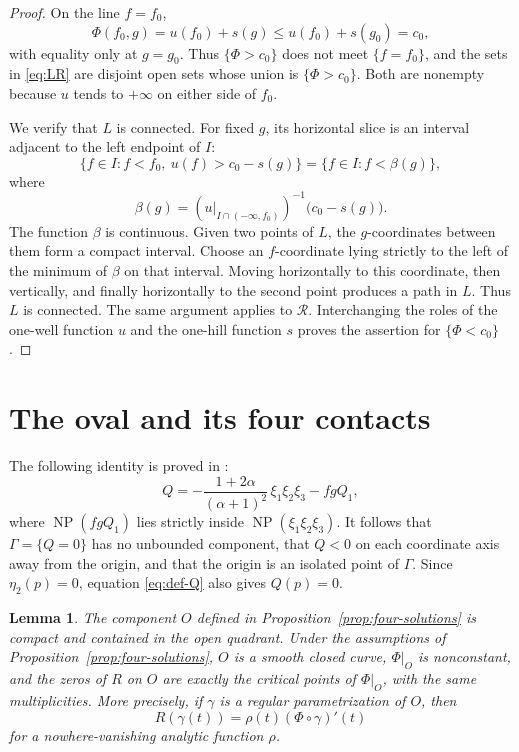 \documentclass[10pt,reqno]{amsart}
\numberwithin{equation}{section}
\theoremstyle{plain}
\newtheorem{lemma}[theorem]{Lemma}
\theoremstyle{remark}
\newcommand{\NP}{\operatorname{NP}}
\newcommand{\restr}[2]{#1\big|_{#2}}
\begin{document}
\begin{proof}
On the line $f=f_0$,
\begin{equation}\label{eq:line-separation}
  \Phi(f_0,g)=u(f_0)+s(g)
  \leq u(f_0)+s(g_0)=c_0,
\end{equation}
with equality only at $g=g_0$.  Thus $\{\Phi>c_0\}$ does not meet
$\{f=f_0\}$, and the sets in \eqref{eq:LR} are disjoint open sets whose
union is $\{\Phi>c_0\}$.  Both are nonempty because $u$ tends to
$+\infty$ on either side of $f_0$.

We verify that $L$ is connected.  For fixed $g$, its horizontal slice is
an interval adjacent to the left endpoint of $I$:
\begin{equation}\label{eq:beta}
  \{f\in I:f<f_0,\ u(f)>c_0-s(g)\}
  =\{f\in I:f<\beta(g)\},
\end{equation}
where
\begin{equation}\label{eq:beta-def}
  \beta(g)
  =\left(\restr{u}{I\cap(-\infty,f_0)}\right)^{-1}
     \bigl(c_0-s(g)\bigr).
\end{equation}
The function $\beta$ is continuous.  Given two points of $L$, the
$g$-coordinates between them form a compact interval.  Choose an
$f$-coordinate lying strictly to the left of the minimum of $\beta$ on
that interval.  Moving horizontally to this coordinate, then vertically,
and finally horizontally to the second point produces a path in $L$.
Thus $L$ is connected.  The same argument applies to $\mathcal R$.
Interchanging the roles of the one-well function $u$ and the one-hill
function $s$ proves the assertion for $\{\Phi<c_0\}$.
\end{proof}

\section{The oval and its four contacts}\label{sec:oval}

The following identity is proved in \cite{GNS}:
\begin{equation}\label{eq:GNS-identity}
  Q=-\frac{1+2\alpha}{(\alpha+1)^2}\,\xi_1\xi_2\xi_3-fgQ_1,
\end{equation}
where $\NP(fgQ_1)$ lies strictly inside
$\NP(\xi_1\xi_2\xi_3)$.  It follows that $\Gamma=\{Q=0\}$ has no unbounded component, that
$Q<0$ on each coordinate axis away from the origin, and that the origin is
an isolated point of $\Gamma$.  Since
$\eta_2(p)=0$, equation \eqref{eq:def-Q} also gives $Q(p)=0$.

\begin{lemma}\label{lem:oval}
The component $O$ defined in Proposition~\ref{prop:four-solutions} is
compact and contained in the open quadrant.  Under the assumptions of
Proposition~\ref{prop:four-solutions}, $O$ is a smooth closed curve,
$\restr{\Phi}{O}$ is nonconstant, and the zeros of $R$ on $O$ are exactly
the critical points of $\restr{\Phi}{O}$, with the same multiplicities.
More precisely, if $\gamma$ is a regular parametrization of $O$, then
\begin{equation}\label{eq:R-on-oval}
  R(\gamma(t))=\rho(t)(\Phi\circ\gamma)'(t)
\end{equation}
for a nowhere-vanishing analytic function $\rho$.
\end{lemma}
\end{document}
